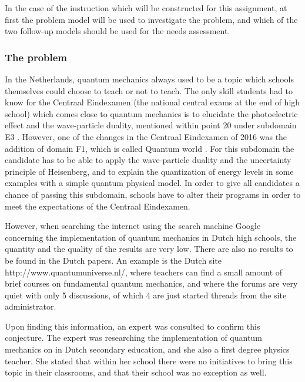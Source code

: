 \documentclass[11pt,twoside]{report} %
\begin{document}
In the case of the instruction which will be constructed for this assignment, at first the problem model will be used to investigate the problem, and which of the two follow-up models should be used for the needs assessment.

\subsubsection{The problem}
\label{sssec:problem}

In the Netherlands, quantum mechanics always used to be a topic which schools themselves could choose to teach or not to teach. The only skill students had to know for the Centraal Eindexamen (the national central exams at the end of high school) which comes close to quantum mechanics is to elucidate the photoelectric effect and the wave-particle duality, mentioned within point 20 under subdomain E3 \cite{eindexamen2015}. However, one of the changes in the Centraal Eindexamen of 2016 was the addition of domain F1, which is called Quantum world \cite{eindexamen2016}. For this subdomain the candidate has to be able to apply the wave-particle duality and the uncertainty principle of Heisenberg, and to explain the quantization of energy levels in some examples with a simple quantum physical model. In order to give all candidates a chance of passing this subdomain, schools have to alter their programs in order to meet the expectations of the Centraal Eindexamen.

However, when searching the internet using the search machine Google concerning the implementation of quantum mechanics in Dutch high schools, the quantity and the quality of the results are very low. There are also no results to be found in the Dutch papers. An example is the Dutch site http://www.quantumuniverse.nl/, where teachers can find a small amount of brief courses on fundamental quantum mechanics, and where the forums are very quiet with only 5 discussions, of which 4 are just started threads from the site administrator.

Upon finding this information, an expert was consulted to confirm this conjecture. The expert was researching the implementation of quantum mechanics on in Dutch secondary education, and she also a first degree physics teacher. She stated that within her school there were no initiatives to bring this topic in their classrooms, and that their school was no exception as well.
\end{document}
